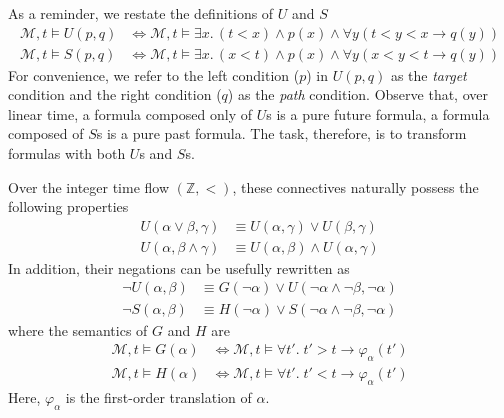 \documentclass[a4paper,UKenglish,cleveref, autoref, thm-restate, numberwithinsect]{lipics-v2021}
\begin{document}
As a reminder, we restate the definitions of $U$ and $S$
\begin{equation*}
    \begin{aligned}
        \mathcal{M}, t \vDash U(p, q) &\Longleftrightarrow \mathcal{M}, t \vDash \exists x.\, (t < x) \land p(x) \land \forall y \left( t < y < x \to q\left( y \right) \right)\\
        \mathcal{M}, t \vDash S(p, q) &\Longleftrightarrow \mathcal{M}, t \vDash \exists x.\, (x < t) \land p(x) \land \forall y \left( x < y < t \to q\left( y \right) \right)
    \end{aligned}
\end{equation*}
For convenience, we refer to the left condition ($p$) in $U(p, q)$ as the \textit{target} condition and the right condition ($q$) as the \textit{path} condition. Observe that, over linear time, a formula composed only of $U$s is a pure future formula, a formula composed of $S$s is a pure past formula. The task, therefore, is to transform formulas with both $U$s and $S$s.

Over the integer time flow $(\mathbb{Z}, <)$, these connectives naturally possess the following properties
\begin{equation}
    \label{eq:or-and-S-U}
    \begin{aligned}
        U(\alpha \lor \beta, \gamma) &\equiv U(\alpha, \gamma) \lor U(\beta, \gamma)\\
        U(\alpha, \beta \land \gamma) &\equiv U(\alpha, \beta) \land U(\alpha, \gamma)
    \end{aligned}
\end{equation}
In addition, their negations can be usefully rewritten as
\begin{equation*}
    \begin{aligned}
        \lnot U(\alpha, \beta) &\equiv G(\lnot \alpha) \lor U(\lnot \alpha \land \lnot \beta, \lnot \alpha) \\
        \lnot S(\alpha, \beta) &\equiv H(\lnot \alpha) \lor S(\lnot \alpha \land \lnot \beta, \lnot \alpha)
    \end{aligned}
\end{equation*}
where the semantics of $G$ and $H$ are
\begin{equation*}
    \begin{aligned}
        \mathcal{M}, t \vDash G(\alpha) &\Longleftrightarrow \mathcal{M}, t \vDash \forall t'.\; t' > t \to \varphi_\alpha(t') \\
        \mathcal{M}, t \vDash H(\alpha) &\Longleftrightarrow \mathcal{M}, t \vDash \forall t'.\; t' < t \to \varphi_\alpha(t')
    \end{aligned}
\end{equation*}
Here, $\varphi_\alpha$ is the first-order translation of $\alpha$.
\end{document}
